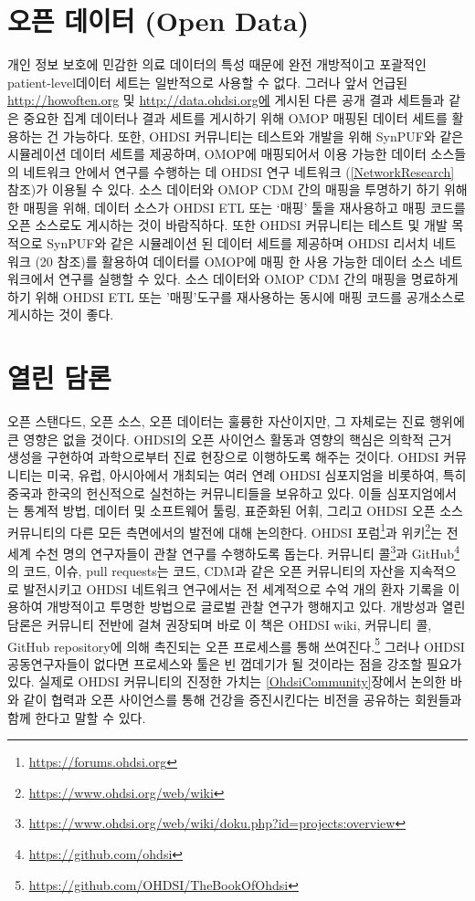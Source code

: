 \documentclass[11pt]{book}
\let\rmarkdownfootnote\footnote%
\def\footnote{\protect\rmarkdownfootnote}
\theoremstyle{definition}
\theoremstyle{definition}
\theoremstyle{definition}
\theoremstyle{remark}
\begin{document}
\section{오픈 데이터 (Open Data)}\label{--open-data}


개인 정보 보호에 민감한 의료 데이터의 특성 때문에 완전 개방적이고
포괄적인 patient-level데이터 세트는 일반적으로 사용할 수 없다. 그러나
앞서 언급된 \url{http://howoften.org} 및 \url{http://data.ohdsi.org에}
게시된 다른 공개 결과 세트들과 같은 중요한 집계 데이터나 결과 세트를
게시하기 위해 OMOP 매핑된 데이터 세트를 활용하는 건 가능하다. 또한,
OHDSI 커뮤니티는 테스트와 개발을 위해 SynPUF와 같은 시뮬레이션 데이터
세트를 제공하며, OMOP에 매핑되어서 이용 가능한 데이터 소스들의 네트워크
안에서 연구를 수행하는 데 OHDSI 연구 네트워크 (\ref{NetworkResearch}
참조)가 이용될 수 있다. 소스 데이터와 OMOP CDM 간의 매핑을 투명하기 하기
위해 한 매핑을 위해, 데이터 소스가 OHDSI ETL 또는 `매핑' 툴을 재사용하고
매핑 코드를 오픈 소스로도 게시하는 것이 바람직하다. 또한 OHDSI
커뮤니티는 테스트 및 개발 목적으로 SynPUF와 같은 시뮬레이션 된 데이터
세트를 제공하며 OHDSI 리서치 네트워크 (20 참조)를 활용하여 데이터를
OMOP에 매핑 한 사용 가능한 데이터 소스 네트워크에서 연구를 실행할 수
있다. 소스 데이터와 OMOP CDM 간의 매핑을 명료하게 하기 위해 OHDSI ETL
또는 '매핑'도구를 재사용하는 동시에 매핑 코드를 공개소스로 게시하는 것이
좋다.

\section{열린 담론}\label{-}


오픈 스탠다드, 오픈 소스, 오픈 데이터는 훌륭한 자산이지만, 그 자체로는
진료 행위에 큰 영향은 없을 것이다. OHDSI의 오픈 사이언스 활동과 영향의
핵심은 의학적 근거 생성을 구현하여 과학으로부터 진료 현장으로 이행하도록
해주는 것이다. OHDSI 커뮤니티는 미국, 유럽, 아시아에서 개최되는 여러
연례 OHDSI 심포지엄을 비롯하여, 특히 중국과 한국의 헌신적으로 실천하는
커뮤니티들을 보유하고 있다. 이들 심포지엄에서는 통계적 방법, 데이터 및
소프트웨어 툴링, 표준화된 어휘, 그리고 OHDSI 오픈 소스 커뮤니티의 다른
모든 측면에서의 발전에 대해 논의한다. OHDSI 포럼\footnote{\url{https://forums.ohdsi.org}}과
위키\footnote{\url{https://www.ohdsi.org/web/wiki}}는 전 세계 수천 명의
연구자들이 관찰 연구를 수행하도록 돕는다. 커뮤니티 콜\footnote{\url{https://www.ohdsi.org/web/wiki/doku.php?id=projects:overview}}과
GitHub\footnote{\url{https://github.com/ohdsi}}의 코드, 이슈, pull
requests는 코드, CDM과 같은 오픈 커뮤니티의 자산을 지속적으로 발전시키고
OHDSI 네트워크 연구에서는 전 세계적으로 수억 개의 환자 기록을 이용하여
개방적이고 투명한 방법으로 글로벌 관찰 연구가 행해지고 있다. 개방성과
열린 담론은 커뮤니티 전반에 걸쳐 권장되며 바로 이 책은 OHDSI wiki,
커뮤니티 콜, GitHub repository에 의해 촉진되는 오픈 프로세스를 통해
쓰여진다.\footnote{\url{https://github.com/OHDSI/TheBookOfOhdsi}} 그러나
OHDSI 공동연구자들이 없다면 프로세스와 툴은 빈 껍데기가 될 것이라는 점을
강조할 필요가 있다. 실제로 OHDSI 커뮤니티의 진정한 가치는
\ref{OhdsiCommunity}장에서 논의한 바와 같이 협력과 오픈 사이언스를 통해
건강을 증진시킨다는 비전을 공유하는 회원들과 함께 한다고 말할 수 있다.
\end{document}
